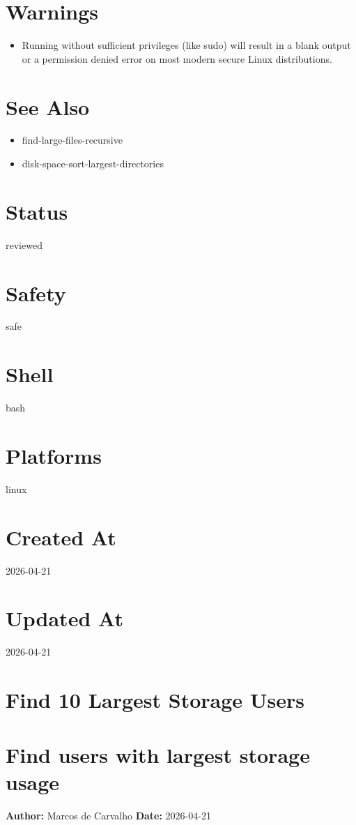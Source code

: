 \documentclass[openany]{book}
\begin{document}
\section*{Warnings}
\begin{itemize}
  \item Running without sufficient privileges (like sudo) will result in a blank output or a permission denied error on most modern secure Linux distributions.
\end{itemize}

\section*{See Also}
\begin{itemize}
  \item find-large-files-recursive
  \item disk-space-sort-largest-directories
\end{itemize}

\section*{Status}
reviewed

\section*{Safety}
safe

\section*{Shell}
bash

\section*{Platforms}
linux

\section*{Created At}
2026-04-21

\section*{Updated At}
2026-04-21

\section{Find 10 Largest Storage Users}
\section*{Find users with largest storage usage}
\textbf{Author:} Marcos de Carvalho \hfill \textbf{Date:} 2026-04-21
\end{document}
